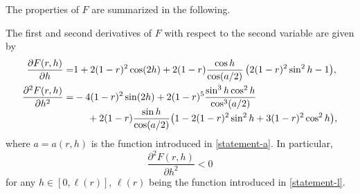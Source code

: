 The properties of $F$ are summarized in the following.
\begin{proposition}\label{prop5}
The first and second derivatives of $F$ with respect to the second variable are given by
\begin{align}
\frac{\partial F(r,h)}{\partial h} = &1+2(1-r)^2 \cos(2h)+2(1-r)\frac{\cos h}{\cos(a/2)}\,\bigl(2(1-r)^2\sin^2 h -1\bigr), \label{ap2}
\\
\frac{\partial^2 F(r,h)}{\partial h^2} = & - 4 (1-r)^2 \sin(2h) + 2 (1-r)^5 \frac{\sin^3 h \cos^2 h}{\cos^3(a/2)}\label{ap3}
\\[-5pt]
& \hspace*{.5cm}+2 (1-r)\frac{\sin h}{\cos(a/2)} \bigl( 1-2(1-r)^2\sin^2 h + 3 (1-r)^2 \cos^2 h \bigr),\notag
\end{align}
where $a=a(r,h)$ is the function introduced in \eqref{statement-a}.
In particular,
\[
\frac{\partial^2 F(r,h)}{\partial h^2}<0
\]
for any $h\in [0,\ell(r)]$, $\ell(r)$ being the function introduced in \eqref{statement-l}.
\end{proposition}
